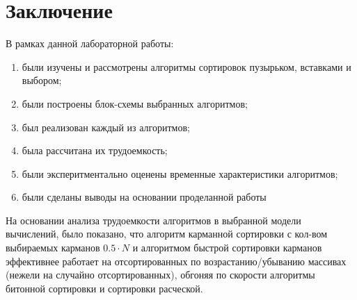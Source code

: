 \documentclass[12pt]{report}
\begin{document}
	\chapter*{Заключение}
	
	В рамках данной лабораторной работы:
	
	\begin{enumerate}
		\item были изучены и рассмотрены алгоритмы сортировок пузырьком, вставками и выбором;
		\item были построены блок-схемы выбранных алгоритмов;
		\item был реализован каждый из алгоритмов;
		\item была рассчитана их трудоемкость;
		\item были эксперитментально оценены временные характеристики алгоритмов;
		\item были сделаны выводы на основании проделанной работы
	\end{enumerate}
	
	На основании анализа трудоемкости алгоритмов в выбранной модели вычислений, было показано, что алгоритм карманной сортировки с кол-вом выбираемых карманов $0.5 \cdot N$ и алгоритмом быстрой сортировки карманов эффективнее работает на отсортированных по возрастанию/убыванию массивах (нежели на случайно отсортированных), обгоняя по скорости алгоритмы битонной сортировки и сортировки расческой.
	

\nocite{*} 

\renewcommand\bibname{Список литературы} %
	
\end{document}
